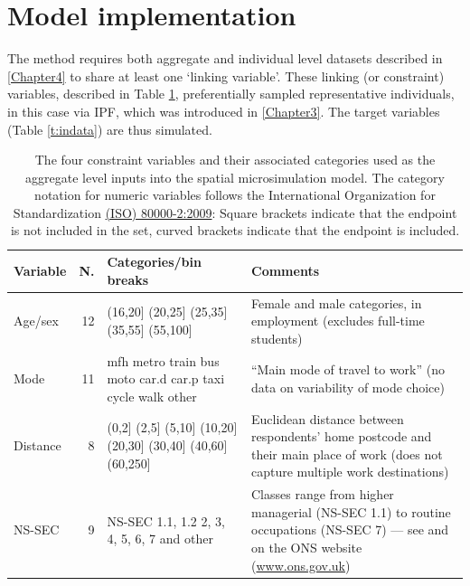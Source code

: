 \section{Model implementation} \label{Methods}
The method requires both aggregate and individual
level datasets described in \cref{Chapter4} to
share at least one `linking variable'. These linking (or constraint)
variables, described in Table \ref{t:constraints},
preferentially sampled representative
individuals, in this case via IPF, which was introduced in
\cref{Chapter3}. The target variables (Table
\ref{t:indata}) are thus simulated.

\begin{table}[htbp]
\caption[Aggregate level inputs into the spatial microsimulation model]
{The four constraint variables and their associated categories used as
the aggregate level inputs into the spatial microsimulation model.
The category notation for numeric variables follows
the International Organization for Standardization
\href{http://www.iso.org/iso/catalogue_detail?csnumber=31887}
{(ISO) 80000-2:2009}:
Square brackets indicate that the endpoint is not included in the set,
curved brackets indicate that the endpoint is included.}

\begin{center}
\begin{tabular}{lrp{3cm}p{8cm}}\toprule
Variable & \multicolumn{1}{l}{N. } & Categories/bin breaks & Comments \\ \midrule
Age/sex & 12 & (16,20] (20,25] (25,35] (35,55] (55,100] & Female and male categories, in employment (excludes full-time students) \\
Mode & 11 & mfh       metro     train     bus       moto      car.d     car.p
taxi      cycle     walk      other & “Main mode of travel to work” (no data on variability of mode choice) \\
Distance & 8 & (0,2] (2,5] (5,10] (10,20] (20,30] (30,40] (40,60] (60,250] &
Euclidean distance between respondents' home postcode and their main place of work (does not capture multiple work destinations) \\
NS-SEC & 9 & NS-SEC 1.1, 1.2 2, 3, 4, 5, 6, 7 and other & Classes range
from higher managerial (NS-SEC  1.1) to routine occupations (NS-SEC 7) --- see
\citep{chandola2000new} and on the ONS website
(\href{http://www.ons.gov.uk/ons/guide-method/classifications/current-standard-classifications/soc2010/soc2010-volume-3-ns-sec--rebased-on-soc2010--user-manual/index.html}{www.ons.gov.uk}) \\
\bottomrule
\end{tabular}\end{center}
\label{t:constraints}
\end{table}

